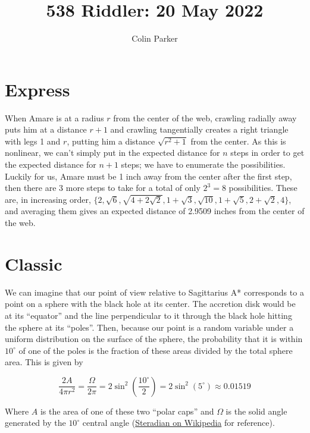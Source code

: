 \documentclass[11pt]{article} %
\title{538 Riddler: 20 May 2022}
\author{Colin Parker}
\begin{document}
\maketitle

\section{Express}

When Amare is at a radius $r$ from the center of the web, crawling radially away puts him at a distance $r + 1$ and
crawling tangentially creates a right triangle with legs 1 and $r$, putting him a distance $\sqrt{r^2 + 1}$ from the
center. As this is nonlinear, we can't simply put in the expected distance for $n$ steps in order to get the
expected distance for $n + 1$ steps; we have to enumerate the possibilities. Luckily for us, Amare must be 1 inch
away from the center after the first step, then there are 3 more steps to take for a total of only $2^3 = 8$ possibilities.
These are, in increasing order, $\{ 2, \sqrt6, \sqrt{4 + 2\sqrt2}, 1 + \sqrt3, \sqrt{10}, 1 + \sqrt5, 2 + \sqrt2, 4 \}$,
and averaging them gives an expected distance of 2.9509 inches from the center of the web. 

\section{Classic}

We can imagine that our point of view relative to Sagittarius A* corresponds to a point on a sphere with the black
hole at its center. The accretion disk would be at its ``equator'' and the line perpendicular to it through the black hole
hitting the sphere at its ``poles''. Then, because our point is a random variable under a uniform distribution on the
surface of the sphere, the probability that it is within $10^{\circ}$ of one of the poles is the fraction of these areas
divided by the total sphere area. This is given by

$$\frac{2A}{4\pi r^2} = \frac{\Omega}{2\pi} = 2\sin^2\left(\frac{10^{\circ}}{2}\right) = 2\sin^2(5^{\circ}) \approx 0.01519$$

Where $A$ is the area of one of these two ``polar caps'' and $\Omega$ is the solid angle generated by the $10^{\circ}$
central angle (\href{https://en.wikipedia.org/wiki/Steradian}{Steradian on Wikipedia} for reference).
\end{document}
